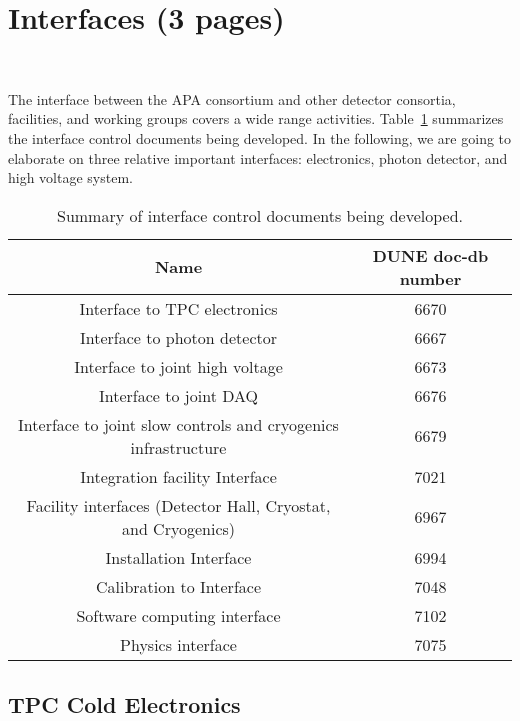 \section{Interfaces (3 pages)} ~\label{sec:fdsp-apa-intfc}


The interface between the APA consortium and other detector consortia, facilities, and working groups
covers a wide range activities. Table~\ref{tab:apa_interface_docdb} summarizes the interface control
documents being developed. In the following, we are going to elaborate on three relative important
interfaces: electronics, photon detector, and high voltage system. 

\begin{table}[!htp]
  \caption{Summary of interface control documents being developed.}  
\medskip
\renewcommand{\arraystretch}{1.1} \centering 
\begin{tabular}{|c|c|}
  \hline
  Name & DUNE doc-db number \\\hline
  Interface to TPC electronics & 6670 \\ 
  Interface to photon detector & 6667 \\
  Interface to joint high voltage & 6673 \\
  Interface to joint DAQ & 6676 \\
  Interface to joint slow controls and cryogenics infrastructure & 6679 \\\hline
  Integration facility Interface & 7021 \\
  Facility interfaces (Detector Hall, Cryostat, and Cryogenics) & 6967 \\
  Installation Interface & 6994 \\
  Calibration to Interface & 7048 \\\hline
  Software computing interface & 7102 \\
  Physics interface & 7075 \\\hline
\end{tabular}\label{tab:apa_interface_docdb}
\end{table}


\subsection{TPC Cold Electronics}~\label{sec:fdsp-apa-intfc-elec}

